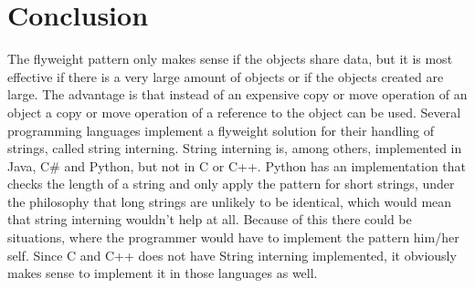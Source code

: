 \section{Conclusion}
The flyweight pattern only makes sense 
if the objects share data, but it is most effective if there is a very large amount of objects or if the objects created are large.
The advantage is that instead of an expensive copy or move operation of an object a copy or move operation of a reference to the object can be used.
Several programming languages implement a flyweight solution for their handling of strings, called string interning.
String interning is, among others, implemented in Java, C\# and Python, but not in C or C++. Python has an implementation that checks the length of a string and only apply the pattern for short strings, under the philosophy that long strings are unlikely to be identical, which would mean that string interning wouldn't help at all. Because of this there could be situations, where the programmer would have to implement the pattern him/her self.
Since C and C++ does not have String interning implemented, it obviously makes sense to implement it in those languages as well.
